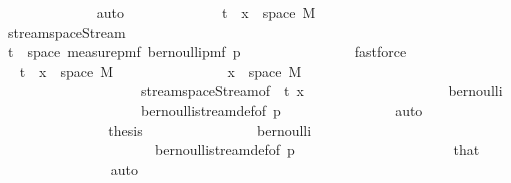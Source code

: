 \begin{isabellebody}
\ \ \ \ \ \ \ \ \ \ \ \ \isamarkupfalse%
\ auto\isanewline
\ \ \ \ \ \ \ \ \ \ \isamarkupfalse%
\ \isamarkupfalse%
\ {\isachardoublequoteopen}{\isacharparenleft}{\kern0pt}t\ {\isacharhash}{\kern0pt}{\isacharhash}{\kern0pt}\ x{\isacharparenright}{\kern0pt}\ {\isasymin}\ space\ M{\isachardoublequoteclose}\isanewline
\ \ \ \ \ \ \ \ \ \ \ \ \isamarkupfalse%
\ stream{\isacharunderscore}{\kern0pt}space{\isacharunderscore}{\kern0pt}Stream\isanewline
\ \ \ \ \ \ \ \ \ \ \isamarkupfalse%
{\isacharminus}{\kern0pt}\isanewline
\ \ \ \ \ \ \ \ \ \ \ \ \isamarkupfalse%
\ {\isachardoublequoteopen}t\ {\isasymin}\ space\ {\isacharparenleft}{\kern0pt}measure{\isacharunderscore}{\kern0pt}pmf\ {\isacharparenleft}{\kern0pt}bernoulli{\isacharunderscore}{\kern0pt}pmf\ p{\isacharparenright}{\kern0pt}{\isacharparenright}{\kern0pt}{\isachardoublequoteclose}\isanewline
\ \ \ \ \ \ \ \ \ \ \ \ \ \ \isamarkupfalse%
\ fastforce\isanewline
\ \ \ \ \ \ \ \ \ \ \ \ \isamarkupfalse%
\ \isamarkupfalse%
\ {\isachardoublequoteopen}{\isacharparenleft}{\kern0pt}t\ {\isacharhash}{\kern0pt}{\isacharhash}{\kern0pt}\ x{\isacharparenright}{\kern0pt}\ {\isasymin}\ space\ M{\isachardoublequoteclose}\isanewline
\ \ \ \ \ \ \ \ \ \ \ \ \ \ \isamarkupfalse%
\ {\isacartoucheopen}x\ {\isasymin}\ space\ M{\isacartoucheclose}\isanewline
\ \ \ \ \ \ \ \ \ \ \ \ \ \ \ \ \ \ \ \ stream{\isacharunderscore}{\kern0pt}space{\isacharunderscore}{\kern0pt}Stream{\isacharbrackleft}{\kern0pt}of\ \ t\ x{\isacharbrackright}{\kern0pt}\isanewline
\ \ \ \ \ \ \ \ \ \ \ \ \ \ \ \ \ \ \ \ bernoulli\isanewline
\ \ \ \ \ \ \ \ \ \ \ \ \ \ \ \ \ \ \ \ bernoulli{\isacharunderscore}{\kern0pt}stream{\isacharunderscore}{\kern0pt}def{\isacharbrackleft}{\kern0pt}of\ p{\isacharbrackright}{\kern0pt}\isanewline
\ \ \ \ \ \ \ \ \ \ \ \ \ \ \isamarkupfalse%
\ auto\isanewline
\ \ \ \ \ \ \ \ \ \ \ \ \isamarkupfalse%
\ \isamarkupfalse%
\ {\isacharquery}{\kern0pt}thesis\isanewline
\ \ \ \ \ \ \ \ \ \ \ \ \ \ \isamarkupfalse%
\ bernoulli\isanewline
\ \ \ \ \ \ \ \ \ \ \ \ \ \ \ \ \ \ \ \ \ \ bernoulli{\isacharunderscore}{\kern0pt}stream{\isacharunderscore}{\kern0pt}def{\isacharbrackleft}{\kern0pt}of\ p{\isacharbrackright}{\kern0pt}\isanewline
\ \ \ \ \ \ \ \ \ \ \ \ \ \ \ \ \ \ \ \ \ \ that\isanewline
\ \ \ \ \ \ \ \ \ \ \ \ \ \ \isamarkupfalse%
\ auto\isanewline
\ \ \ \ \ \ \ \ \ \ \isamarkupfalse%

\end{isabellebody}
